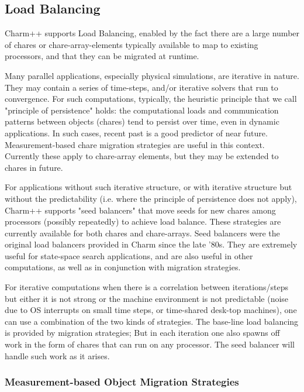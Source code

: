 
\subsection{Load Balancing}
\label{loadbalancing}


Charm++ supports Load Balancing, enabled by the fact there are a large
number of chares or chare-array-elements typically available to map to
existing processors, and that they can be migrated at runtime.

Many parallel applications, especially physical simulations, are
iterative in nature. They may contain a series of time-steps, and/or
iterative solvers that run to convergence. For such computations,
typically, the heuristic principle that we call "principle of
persistence" holds: the computational loads and communication patterns
between objects (chares) tend to persist over time, even in dynamic
applications. In such cases, recent past is a good predictor of near
future. Measurement-based chare migration strategies are useful in
this context. Currently these apply to chare-array elements, but they
may be extended to chares in future.

For applications without such iterative structure, or with iterative
structure but without the predictability (i.e. where the principle of
persistence does not apply), Charm++ supports "seed balancers" that
move seeds for new chares among processors (possibly repeatedly) to
achieve load balance. These strategies are currently available for
both chares and chare-arrays. 
Seed balancers were the original load balancers provided in Charm since the
late '80s. They are extremely useful for state-space search
applications, and are also useful in other computations, as well as in
conjunction with migration strategies.

For iterative computations when there is a correlation between
iterations/steps but either it is not strong or the machine
environment is not predictable (noise due to OS interrupts on small
time steps, or time-shared desk-top machines), one can use a
combination of the two kinds of strategies. The base-line load
balancing is provided by migration strategies; But in each iteration
one also spawns off work in the form of chares that can run on any
processor. The seed balancer will handle such work as it arises.

\subsubsection{Measurement-based Object Migration Strategies}
\label{lbFramework}
\label{migrationlb}

